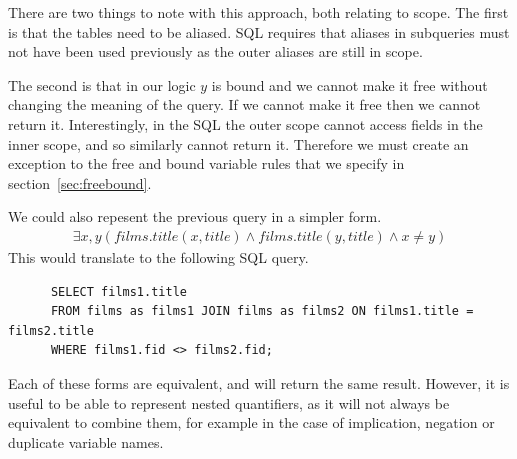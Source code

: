 \documentclass[a4paper, 11pt]{article}
\begin{document}
      There are two things to note with this approach, both relating to scope.
      The first is that the tables need to be aliased. SQL requires that aliases
      in subqueries must not have been used previously as the outer aliases are
      still in scope.

      The second is that in our logic $y$ is bound and we cannot make it free
      without changing the meaning of the query. If we cannot make it free
      then we cannot return it. Interestingly, in the SQL the outer scope cannot
      access fields in the inner scope, and so similarly cannot return it.
      Therefore we must create an exception to the free and bound variable rules
      that we specify in section~\ref{sec:freebound}.

      We could also repesent the previous query in a simpler form.
      \begin{gather}
        \exists x,y(films.title(x, title) \land films.title(y, title)
          \land x \neq y)
      \end{gather}
      This would translate to the following SQL query.

      \begin{verbatim}
      SELECT films1.title
      FROM films as films1 JOIN films as films2 ON films1.title = films2.title
      WHERE films1.fid <> films2.fid;
      \end{verbatim}

      Each of these forms are equivalent, and will return the same result.
      However, it is useful to be able to represent nested quantifiers, as it
      will not always be equivalent to combine them, for example in the case
      of implication, negation or duplicate variable names\cite{washEQUIV}.
\end{document}
